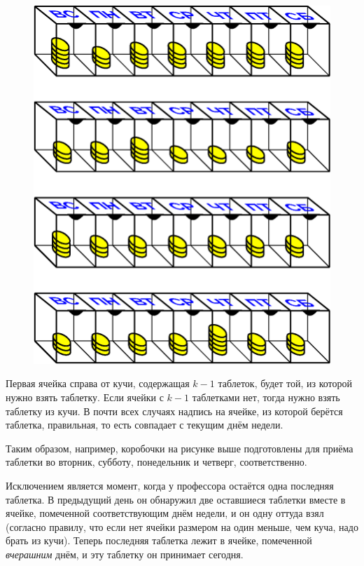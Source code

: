 \begin{figure}[h!]
\centering
\includegraphics[scale=0.5]{Figs/Handicaps/box1-ru}
\end{figure}

Первая ячейка справа от кучи, содержащая $k-1$ таблеток, будет той, из которой нужно взять таблетку.
Если ячейки с $k-1$ таблетками нет, тогда нужно взять таблетку из кучи.
В почти всех случаях надпись на ячейке, из которой берётся таблетка, правильная, то есть совпадает с текущим днём недели.

Таким образом, например, коробочки на рисунке выше подготовлены для приёма таблетки во вторник, субботу, понедельник и четверг, соответственно.

Исключением является момент, когда у профессора остаётся одна последняя таблетка.
В предыдущий день он обнаружил две оставшиеся таблетки вместе в ячейке, помеченной соответствующим днём недели, и он одну оттуда взял (согласно правилу, что если нет ячейки размером на один меньше, чем куча, надо брать из кучи).
Теперь последняя таблетка лежит в ячейке, помеченной \emph{вчерашним} днём, и эту таблетку он принимает сегодня.

